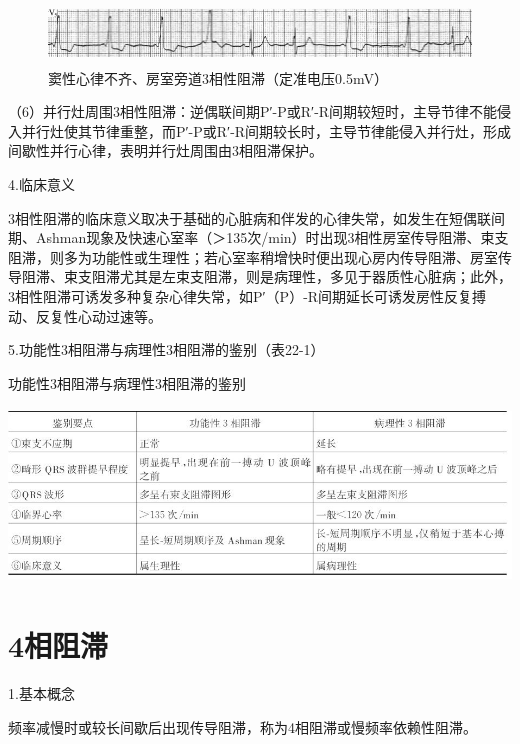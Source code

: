 \begin{figure}[!htbp]
 \centering
 \includegraphics[width=5.78125in,height=0.65625in]{./images/Image00372.jpg}
 \captionsetup{justification=centering}
 \caption{窦性心律不齐、房室旁道3相性阻滞（定准电压0.5mV）}
 \label{fig22-7}
  \end{figure} 

（6）并行灶周围3相性阻滞：逆偶联间期P′-P或R′-R间期较短时，主导节律不能侵入并行灶使其节律重整，而P′-P或R′-R间期较长时，主导节律能侵入并行灶，形成间歇性并行心律，表明并行灶周围由3相阻滞保护。

4.临床意义

3相性阻滞的临床意义取决于基础的心脏病和伴发的心律失常，如发生在短偶联间期、Ashman现象及快速心室率（＞135次/min）时出现3相性房室传导阻滞、束支阻滞，则多为功能性或生理性；若心室率稍增快时便出现心房内传导阻滞、房室传导阻滞、束支阻滞尤其是左束支阻滞，则是病理性，多见于器质性心脏病；此外，3相性阻滞可诱发多种复杂心律失常，如P′（P）-R间期延长可诱发房性反复搏动、反复性心动过速等。

5.功能性3相阻滞与病理性3相阻滞的鉴别（表22-1）

\begin{table}[htbp]
\centering
\caption{功能性3相阻滞与病理性3相阻滞的鉴别}
\label{tab22-1}
\includegraphics[width=5.44792in,height=1.82292in]{./images/Image00373.jpg}
\end{table}

\protect\hypertarget{text00029.htmlux5cux23subid357}{}{}

\section{4相阻滞}

1.基本概念

频率减慢时或较长间歇后出现传导阻滞，称为4相阻滞或慢频率依赖性阻滞。

